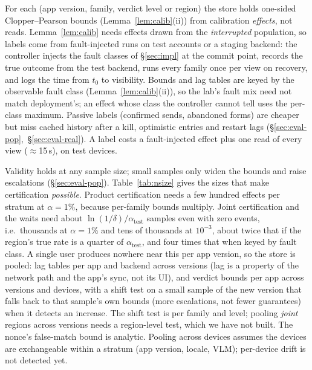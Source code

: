  For each (app version, family, verdict level or region) the store holds one-sided Clopper--Pearson bounds (Lemma~\ref{lem:calib}(ii)) from calibration
\emph{effects}, not reads. Lemma~\ref{lem:calib} needs effects drawn from the \emph{interrupted} population, so labels come from fault-injected runs on test accounts or a staging backend:
the controller injects the fault classes of \S\ref{sec:impl} at the commit point, records the true outcome from the test backend, runs every family once per view on recovery, and logs the
time from $t_0$ to visibility. Bounds and lag tables are keyed by the observable fault class (Lemma~\ref{lem:calib}(ii)), so the lab's fault mix need not match deployment's;
an effect whose class the controller cannot tell uses the per-class maximum. Passive labels (confirmed sends, abandoned forms) are cheaper but miss cached history after a
kill, optimistic entries and restart lags (\S\ref{sec:eval-pop},~\S\ref{sec:eval-real}). A label costs a fault-injected effect plus one read of every view ($\approx$15\,s), on test
devices.

 Validity holds at any sample size; small samples only widen the bounds and raise escalations (\S\ref{sec:eval-pop}). Table~\ref{tab:nsize} gives the sizes that
make certification \emph{possible}. Product certification needs a few hundred effects per stratum at $\alpha{=}1\%$, because per-family bounds multiply. Joint certification and the waits
need about $\ln(1/\delta)/\alpha_{\mathrm{test}}$ samples even with zero events, i.e.\ thousands at $\alpha{=}1\%$ and tens of thousands at $10^{-3}$, about twice that if the region's true
rate is a quarter of $\alpha_{\mathrm{test}}$, and four times that when keyed by fault class. A single user produces nowhere near this per app version, so the store is
pooled: lag tables per app and backend across versions (lag is a property of the network path and the app's sync, not its UI), and verdict bounds per app across versions and devices,
with a shift test on a small sample of the new version that falls back to that sample's own bounds (more escalations, not fewer guarantees) when it detects an increase.
The shift test is per family and level; pooling \emph{joint} regions across versions needs a region-level test, which we have not built. The nonce's
false-match bound is analytic. Pooling across devices assumes the devices are exchangeable within a stratum (app version, locale, VLM); per-device drift is not detected yet.



